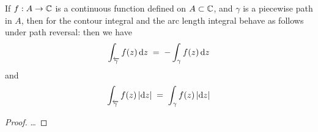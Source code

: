 \begin{lemma}
  \label{lem:integral_reversal}
  If $f : A \to \mathbb{C}$ is a continuous function defined on $A \subset \mathbb{C}$,
  and $\gamma$ is a piecewise path in $A$, then for the contour integral
  and the arc length integral behave as follows under path reversal:
  then we have
  \begin{align*}
    \int_{\overleftarrow{\gamma}} f(z) \, \mathrm{d} z \; = \; - \int_{\gamma} f(z) \, \mathrm{d} z
  \end{align*}
  and
  \begin{align*}
    \int_{\overleftarrow{\gamma}} f(z) \, |\mathrm{d} z| \; = \; \int_{\gamma} f(z) \, |\mathrm{d} z|
  \end{align*}
\end{lemma}
\begin{proof}
  \ldots
\end{proof}

